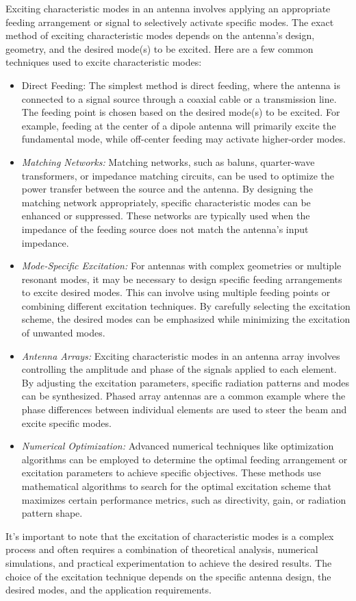 \documentclass[11pt,a4paper]{article}
\begin{document}
Exciting characteristic modes in an antenna involves applying an appropriate feeding arrangement or signal to selectively activate specific modes. The exact method of exciting characteristic modes depends on the antenna's design, geometry, and the desired mode(s) to be excited. Here are a few common techniques used to excite characteristic modes:
\begin{itemize}
    \item Direct Feeding: The simplest method is direct feeding, where the antenna is connected to a signal source through a coaxial cable or a transmission line. The feeding point is chosen based on the desired mode(s) to be excited. For example, feeding at the center of a dipole antenna will primarily excite the fundamental mode, while off-center feeding may activate higher-order modes.
    \item \emph{Matching Networks:} Matching networks, such as baluns, quarter-wave transformers, or impedance matching circuits, can be used to optimize the power transfer between the source and the antenna. By designing the matching network appropriately, specific characteristic modes can be enhanced or suppressed. These networks are typically used when the impedance of the feeding source does not match the antenna's input impedance.
    \item \emph{Mode-Specific Excitation:} For antennas with complex geometries or multiple resonant modes, it may be necessary to design specific feeding arrangements to excite desired modes. This can involve using multiple feeding points or combining different excitation techniques. By carefully selecting the excitation scheme, the desired modes can be emphasized while minimizing the excitation of unwanted modes.
    \item \emph{Antenna Arrays:} Exciting characteristic modes in an antenna array involves controlling the amplitude and phase of the signals applied to each element. By adjusting the excitation parameters, specific radiation patterns and modes can be synthesized. Phased array antennas are a common example where the phase differences between individual elements are used to steer the beam and excite specific modes.
    \item \emph{Numerical Optimization:} Advanced numerical techniques like optimization algorithms can be employed to determine the optimal feeding arrangement or excitation parameters to achieve specific objectives. These methods use mathematical algorithms to search for the optimal excitation scheme that maximizes certain performance metrics, such as directivity, gain, or radiation pattern shape.
\end{itemize}
It's important to note that the excitation of characteristic modes is a complex process and often requires a combination of theoretical analysis, numerical simulations, and practical experimentation to achieve the desired results. The choice of the excitation technique depends on the specific antenna design, the desired modes, and the application requirements.
\end{document}
